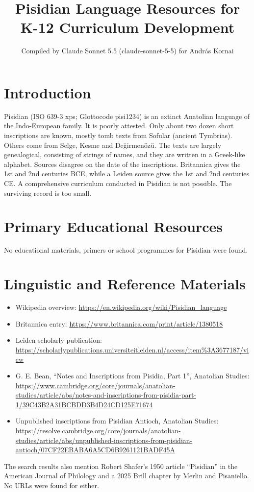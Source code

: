 \documentclass[12pt]{article}
\title{Pisidian Language Resources for K-12 Curriculum Development}
\author{Compiled by Claude Sonnet 5.5 (claude-sonnet-5-5) for Andr\'as Kornai}
\date{}
\begin{document}
\maketitle

\section{Introduction}
Pisidian (ISO 639-3 xps; Glottocode pisi1234) is an extinct Anatolian language of the Indo-European family. It is poorly attested. Only about two dozen short inscriptions are known, mostly tomb texts from Sofular (ancient Tymbrias). Others come from Selge, Kesme and Değirmenözü. The texts are largely genealogical, consisting of strings of names, and they are written in a Greek-like alphabet. Sources disagree on the date of the inscriptions. Britannica gives the 1st and 2nd centuries BCE, while a Leiden source gives the 1st and 2nd centuries CE. A comprehensive curriculum conducted in Pisidian is not possible. The surviving record is too small.

\section{Primary Educational Resources}
No educational materials, primers or school programmes for Pisidian were found.

\section{Linguistic and Reference Materials}
\begin{itemize}
\item Wikipedia overview: \url{https://en.wikipedia.org/wiki/Pisidian_language}
\item Britannica entry: \url{https://www.britannica.com/print/article/1380518}
\item Leiden scholarly publication: \url{https://scholarlypublications.universiteitleiden.nl/access/item%3A3677187/view}
\item G. E. Bean, ``Notes and Inscriptions from Pisidia, Part 1'', Anatolian Studies: \url{https://www.cambridge.org/core/journals/anatolian-studies/article/abs/notes-and-inscriptions-from-pisidia-part-1/39C43B2A31BCBDD3B4D24CD125E71674}
\item Unpublished inscriptions from Pisidian Antioch, Anatolian Studies: \url{https://resolve.cambridge.org/core/journals/anatolian-studies/article/abs/unpublished-inscriptions-from-pisidian-antioch/07CF22EBABA6A5CD6B9261121BADF45A}
\end{itemize}
The search results also mention Robert Shafer's 1950 article ``Pisidian'' in the American Journal of Philology and a 2025 Brill chapter by Merlin and Pisaniello. No URLs were found for either.
\end{document}
